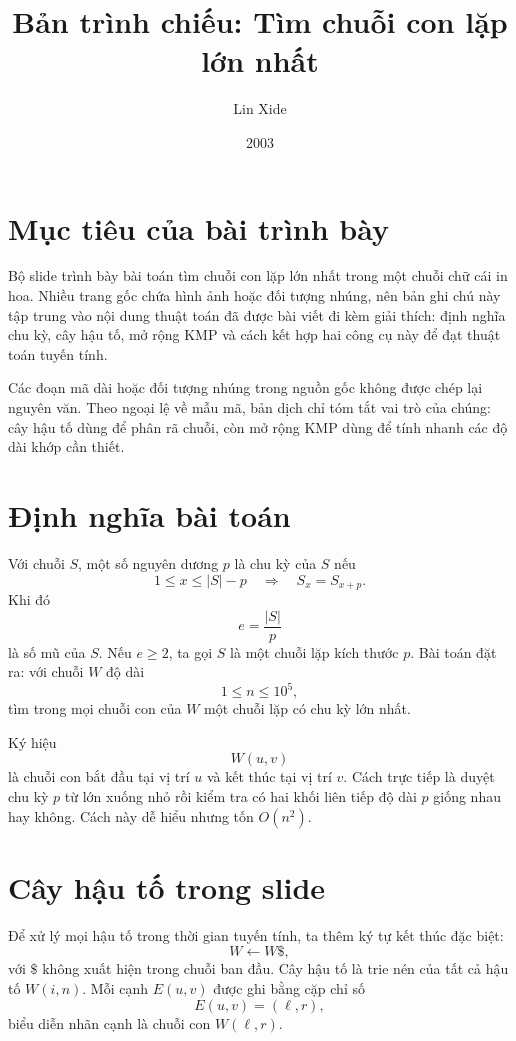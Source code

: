 \documentclass[11pt]{article}
\title{Bản trình chiếu: Tìm chuỗi con lặp lớn nhất}
\author{Lin Xide}
\date{2003}
\begin{document}
\maketitle


\section{Mục tiêu của bài trình bày}

Bộ slide trình bày bài toán tìm chuỗi con lặp lớn nhất trong một chuỗi chữ
cái in hoa. Nhiều trang gốc chứa hình ảnh hoặc đối tượng nhúng, nên bản ghi
chú này tập trung vào nội dung thuật toán đã được bài viết đi kèm giải thích:
định nghĩa chu kỳ, cây hậu tố, mở rộng KMP và cách kết hợp hai công cụ này để
đạt thuật toán tuyến tính.

Các đoạn mã dài hoặc đối tượng nhúng trong nguồn gốc không được chép lại
nguyên văn. Theo ngoại lệ về mẫu mã, bản dịch chỉ tóm tắt vai trò của chúng:
cây hậu tố dùng để phân rã chuỗi, còn mở rộng KMP dùng để tính nhanh các độ
dài khớp cần thiết.

\section{Định nghĩa bài toán}

Với chuỗi \(S\), một số nguyên dương \(p\) là chu kỳ của \(S\) nếu
\[
  1\le x\le |S|-p \quad\Longrightarrow\quad S_x=S_{x+p}.
\]
Khi đó
\[
  e=\frac{|S|}{p}
\]
là số mũ của \(S\). Nếu \(e\ge2\), ta gọi \(S\) là một chuỗi lặp kích thước
\(p\). Bài toán đặt ra: với chuỗi \(W\) độ dài
\[
  1\le n\le10^5,
\]
tìm trong mọi chuỗi con của \(W\) một chuỗi lặp có chu kỳ lớn nhất.

Ký hiệu
\[
  W(u,v)
\]
là chuỗi con bắt đầu tại vị trí \(u\) và kết thúc tại vị trí \(v\). Cách trực
tiếp là duyệt chu kỳ \(p\) từ lớn xuống nhỏ rồi kiểm tra có hai khối liên tiếp
độ dài \(p\) giống nhau hay không. Cách này dễ hiểu nhưng tốn \(O(n^2)\).

\section{Cây hậu tố trong slide}

Để xử lý mọi hậu tố trong thời gian tuyến tính, ta thêm ký tự kết thúc đặc
biệt:
\[
  W\leftarrow W\$,
\]
với \(\$\) không xuất hiện trong chuỗi ban đầu. Cây hậu tố là trie nén của
tất cả hậu tố \(W(i,n)\). Mỗi cạnh \(E(u,v)\) được ghi bằng cặp chỉ số
\[
  E(u,v)=(\ell,r),
\]
biểu diễn nhãn cạnh là chuỗi con \(W(\ell,r)\).
\end{document}

